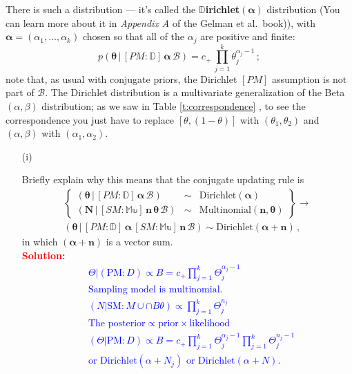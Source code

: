 \documentclass[12pt]{article}
\newcommand{\given}{\, | \,}
\renewcommand{\b}[1]{\textbf{#1}}
\begin{document}
\begin{itemize}
\begin{itemize}
There is such a distribution --- it's called the $\mathbb{D}$\b{irichlet}$( \bm{ \alpha } )$ distribution (You can learn more about it in \textit{Appendix A} of the Gelman et al.~book)), with $\bm{ \alpha } = ( \alpha_1, \dots, \alpha_k )$ chosen so that all of the $\alpha_j$ are positive and finite:
\begin{equation} \label{e:multinomial-12}
p ( \bm{ \theta } \given [ PM \! \! : \mathbb{ D } ] \, \bm{ \alpha } \, \mathcal{ B } ) = c_+ \, \prod_{ j = 1 }^k \theta_j^{ \alpha_j - 1 } \, ;
\end{equation}
note that, as usual with conjugate priors, the Dirichlet $[ PM ]$ assumption is not part of $\mathcal{ B }$. The Dirichlet distribution is a multivariate generalization of the Beta$( \alpha, \beta )$ distribution; as we saw in Table \ref{t:correspondence} , to see the correspondence you just have to replace $[ \theta, ( 1 - \theta ) ]$ with $( \theta_1, \theta_2 )$ and $( \alpha, \beta )$ with $( \alpha_1, \alpha_2 )$.

\begin{itemize}

\item[(i)]

Briefly explain why this means that the conjugate updating rule is
\begin{eqnarray} \label{e:multinomial-13}
\left\{ \begin{array}{ccc} ( \bm{ \theta } \given [ PM \! \! : \mathbb{ D } ] \, \bm{ \alpha } \, \mathcal{ B } ) & \sim & \textrm{Dirichlet} ( \bm{ \alpha } ) \\ ( \bm{ N } \given [ SM \! \! : \mathbb{ Mu } ] \, \bm{ n } \, \bm{ \theta } \, \mathcal{ B } ) & \sim & \textrm{Multinomial} ( \bm{ n }, \bm{ \theta } ) \end{array} \right\} \longrightarrow \nonumber \\ ( \bm{ \theta } \given [ PM \! \! : \mathbb{ D } ] \, \bm{ \alpha } \, [ SM \! \! : \mathbb{ Mu } ] \, \bm{ n } \, \mathcal{ B } ) \sim \textrm{Dirichlet} ( \bm{ \alpha } + \bm{ n } ) \, ,
\end{eqnarray} 
in which $( \bm{ \alpha } + \bm{ n } )$ is a vector sum. \fbox{\textbf{\textit{[10 points]}}} \\
 \textcolor{red}{\textbf{Solution:}} \\
\textcolor{blue}{\[
\begin{aligned}
& \Theta | (\text{PM} : D) \propto B = c_{+} \prod_{j=1}^{k} \Theta_{j}^{\alpha_{j}-1} \\
& \text{Sampling model is multinomial.} \\
& (N | \text{SM} : M \cup \cap B\theta) \propto \prod_{j=1}^{k} \Theta_{j}^{n_j} \\
& \text{The posterior} \propto \text{prior} \times \text{likelihood} \\
& (\Theta | \text{PM} : D) \propto B =  c_{+} \prod_{j=1}^{k} \Theta_{j}^{\alpha_{j} - 1} \prod_{j=1}^{k} \Theta_{j}^{n_{j} - 1} \\
& \text{or Dirichlet}(\alpha + N_{j}) \text{ or Dirichlet}(\alpha + N).
\end{aligned}
\]
}


\end{itemize}
\end{itemize}
\end{itemize}
\end{document}
